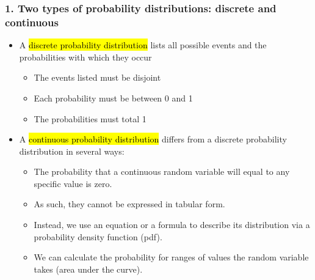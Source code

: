 \documentclass[11pt,containsverbatim,handout,xcolor=xelatex,dvipsnames,table]{beamer}
\begin{document}

\begin{frame}
\frametitle{1. Two types of probability distributions: discrete and continuous}

\begin{itemize}

\item A \hl{discrete probability distribution} lists all possible events and the probabilities with 
which they occur
\begin{itemize}
\item The events listed must be disjoint
\item Each probability must be between 0 and 1 
\item The probabilities must total 1
\end{itemize}

\pause

\item A \hl{continuous probability distribution} differs from a discrete probability distribution in 
several ways:
\begin{itemize}
\item The probability that a continuous random variable will equal to any specific value is zero.
\item As such, they cannot be expressed in tabular form.
\item Instead, we use an equation or a formula to describe its distribution via a probability density 
function (pdf).
\item We can calculate the probability for ranges of values the random variable takes (area under 
the curve).
\end{itemize}

\end{itemize}

\end{frame}

\end{document}
